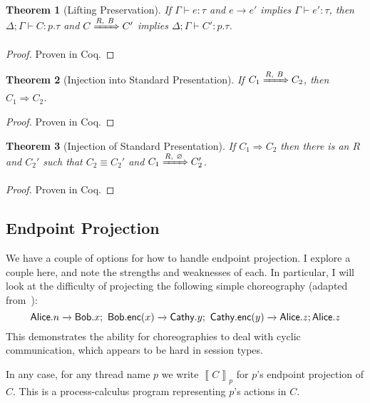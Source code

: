 \documentclass{article}
\newtheorem{thm}{Theorem}
\theoremstyle{definition}
\newcommand{\To}{\Rightarrow}
\newcommand{\ceq}{\equiv}
\newcommand{\own}[2]{#1.#2}
\newcommand{\send}[3][]{#2\nolinebreak \mathrel{\xrightarrow{#1}}\nolinebreak #3}
\newcommand{\proves}{\vdash}
\newcommand{\transb}[1]{\left\llbracket #1 \right\rrbracket}
\begin{document}
\begin{thm}[Lifting Preservation]
  \label{thm:lifting-preservation}
  If $\Gamma \proves e : \tau$ and $e \to e'$ implies $\Gamma \proves e' : \tau$, then $\Delta; \Gamma \proves C : p.\tau$ and $C \xRightarrow{R,~B} C'$ implies $\Delta; \Gamma \proves C' : p.\tau$.
\end{thm}
\begin{proof}
  Proven in Coq.
\end{proof}

\begin{thm}[Injection into Standard Presentation]
  If $C_1 \xRightarrow{R,~B} C_2$, then $C_1 \To C_2$.
\end{thm}
\begin{proof}
  Proven in Coq.
\end{proof}

\begin{thm}[Injection of Standard Presentation]
  If $C_1 \To C_2$ then there is an $R$ and $C_2'$ such that $C_2 \ceq C_2'$ and $C_1 \xRightarrow{R,~\varnothing} C_2'$.
\end{thm}
\begin{proof}
  Proven in Coq.
\end{proof}


\subsection{Endpoint Projection}

We have a couple of options for how to handle endpoint projection.
I explore a couple here, and note the strengths and weaknesses of each.
In particular, I will look at the difficulty of projecting the following simple choreography (adapted from~\citet{AschieriG20}):
$$\send{\own{\textsf{Alice}}{n}}{\own{\textsf{Bob}}{x}};~\send{\own{\textsf{Bob}}{\textsf{enc}(x)}}{\own{\textsf{Cathy}}{y}};~\send{\own{\textsf{Cathy}}{\textsf{enc}(y)}}{\own{\textsf{Alice}}{z}}; \own{\textsf{Alice}}{z}$$
This demonstrates the ability for choreographies to deal with cyclic communication, which appears to be hard in session types.

In any case, for any thread name $p$ we write $\transb{C}_p$ for $p$'s endpoint projection of $C$.
This is a process-calculus program representing $p$'s actions in $C$.
\end{document}
